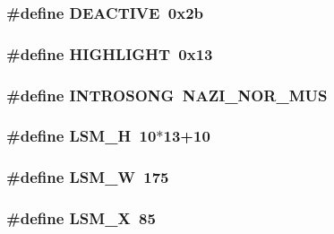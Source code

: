 \label{WL__MENU_8H_a5bf6008e2144536043497d7f080fca3c}
\hypertarget{WL__MENU_8H_ae038d8a4c8f14127f096f27566ef6e94}{
\subsubsection[{DEACTIVE}]{\setlength{\rightskip}{0pt plus 5cm}\#define DEACTIVE~0x2b}}
\label{WL__MENU_8H_ae038d8a4c8f14127f096f27566ef6e94}
\hypertarget{WL__MENU_8H_ab814d2aa388b74d504673d0068cab196}{
\subsubsection[{HIGHLIGHT}]{\setlength{\rightskip}{0pt plus 5cm}\#define HIGHLIGHT~0x13}}
\label{WL__MENU_8H_ab814d2aa388b74d504673d0068cab196}
\hypertarget{WL__MENU_8H_aa5ff03f649da3b1c9c160967d615f572}{
\subsubsection[{INTROSONG}]{\setlength{\rightskip}{0pt plus 5cm}\#define INTROSONG~NAZI\_\-NOR\_\-MUS}}
\label{WL__MENU_8H_aa5ff03f649da3b1c9c160967d615f572}
\hypertarget{WL__MENU_8H_a8cf38e17b7fc1dee592464d3f17c6b26}{
\subsubsection[{LSM\_\-H}]{\setlength{\rightskip}{0pt plus 5cm}\#define LSM\_\-H~10$\ast$13+10}}
\label{WL__MENU_8H_a8cf38e17b7fc1dee592464d3f17c6b26}
\hypertarget{WL__MENU_8H_a1183e7175b1265d4bdae14d38ee03775}{
\subsubsection[{LSM\_\-W}]{\setlength{\rightskip}{0pt plus 5cm}\#define LSM\_\-W~175}}
\label{WL__MENU_8H_a1183e7175b1265d4bdae14d38ee03775}
\hypertarget{WL__MENU_8H_a6b5eb588d722f86b09369b40a4f762e3}{
\subsubsection[{LSM\_\-X}]{\setlength{\rightskip}{0pt plus 5cm}\#define LSM\_\-X~85}}

